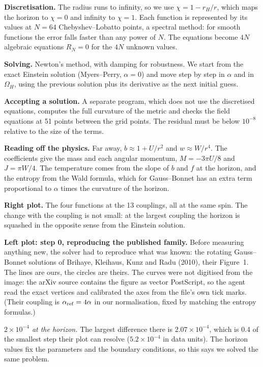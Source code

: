 \documentclass[12pt,a4paper]{article}
\begin{document}
\textbf{Discretisation.} The radius runs to infinity, so we use
$\chi = 1 - r_H/r$, which maps the horizon to $\chi = 0$ and infinity to
$\chi = 1$. Each function is represented by its values at $N = 64$
Chebyshev--Lobatto points, a spectral method: for smooth functions the error
falls faster than any power of $N$. The equations become $4N$ algebraic
equations $R_N = 0$ for the $4N$ unknown values.

\textbf{Solving.} Newton's method, with damping for robustness. We start from
the exact Einstein solution (Myers--Perry, $\alpha = 0$) and move step by step
in $\alpha$ and in $\Omega_H$, using the previous solution plus its derivative as
the next initial guess.

\textbf{Accepting a solution.} A separate program, which does not use the
discretised equations, computes the full curvature of the metric and checks the
field equations at 51 points between the grid points. The residual must be below
$10^{-8}$ relative to the size of the terms.

\textbf{Reading off the physics.} Far away, $b \approx 1 + U/r^2$ and
$w \approx W/r^4$. The coefficients give the mass and each angular momentum,
$M = -3\pi U/8$ and $J = \pi W/4$. The temperature comes from the slope of $b$ and
$f$ at the horizon, and the entropy from the Wald formula, which for
Gauss--Bonnet has an extra term proportional to $\alpha$ times the curvature of
the horizon.

\textbf{Right plot.} The four functions at the 13 couplings, all at the same spin.
The change with the coupling is not small: at the largest coupling the horizon is
squashed in the opposite sense from the Einstein solution.

\textbf{Left plot: step 0, reproducing the published family.} Before measuring
anything new, the solver had to reproduce what was known: the rotating
Gauss--Bonnet solutions of Brihaye, Kleihaus, Kunz and Radu (2010), their
Figure~1. The lines are ours, the circles are theirs. The curves were not
digitised from the image: the arXiv source contains the figure as vector
PostScript, so the agent read the exact vertices and calibrated the axes from
the file's own tick marks. (Their coupling is $\alpha_{\rm ref} = 4\alpha$ in our
normalisation, fixed by matching the entropy formulas.)

\emph{$2\times10^{-4}$ at the horizon.} The largest difference there is
$2.07\times10^{-4}$, which is 0.4 of the smallest step their plot can resolve
($5.2\times10^{-4}$ in data units). The horizon values fix the parameters and the
boundary conditions, so this says we solved the same problem.
\end{document}
